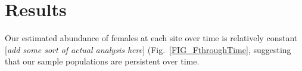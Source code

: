 \documentclass[12pt, oneside]{article}   	%
\begin{document}







\section*{Results}

Our estimated abundance of females at each site over time is relatively constant [\textit{add some sort of actual analysis here}] (Fig.\ \ref{FIG_FthroughTime}, suggesting that our sample populations are persistent over time.
\end{document}
